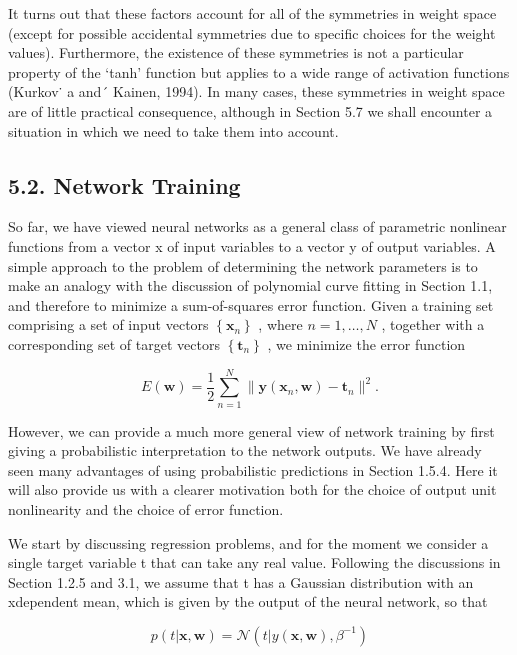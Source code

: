 \documentclass[
  10
]{article}
\begin{document}
It turns out that these factors account for all of the symmetries in
weight space (except for possible accidental symmetries due to specific
choices for the weight values). Furthermore, the existence of these
symmetries is not a particular property of the `tanh' function but
applies to a wide range of activation functions (Kurkov˙ a and´ Kainen,
1994). In many cases, these symmetries in weight space are of little
practical consequence, although in Section 5.7 we shall encounter a
situation in which we need to take them into account.

\subsection{5.2. Network Training}\label{network-training}

So far, we have viewed neural networks as a general class of parametric
nonlinear functions from a vector x of input variables to a vector y of
output variables. A simple approach to the problem of determining the
network parameters is to make an analogy with the discussion of
polynomial curve fitting in Section 1.1, and therefore to minimize a
sum-of-squares error function. Given a training set comprising a set of
input vectors \(\left\{ \mathbf { x } _ { n } \right\}\) , where
\(n = 1 , \ldots , N\) , together with a corresponding set of target
vectors \(\left\{ \mathbf { t } _ { n } \right\}\) , we minimize the
error function

\[
E (\mathbf {w}) = \frac {1}{2} \sum_ {n = 1} ^ {N} \| \mathbf {y} (\mathbf {x} _ {n}, \mathbf {w}) - \mathbf {t} _ {n} \| ^ {2}.\tag{5.11}
\]

However, we can provide a much more general view of network training by
first giving a probabilistic interpretation to the network outputs. We
have already seen many advantages of using probabilistic predictions in
Section 1.5.4. Here it will also provide us with a clearer motivation
both for the choice of output unit nonlinearity and the choice of error
function.

We start by discussing regression problems, and for the moment we
consider a single target variable t that can take any real value.
Following the discussions in Section 1.2.5 and 3.1, we assume that t has
a Gaussian distribution with an xdependent mean, which is given by the
output of the neural network, so that

\[
p (t | \mathbf {x}, \mathbf {w}) = \mathcal {N} \left(t | y (\mathbf {x}, \mathbf {w}), \beta^ {- 1}\right)\tag{5.12}
\]
\end{document}
